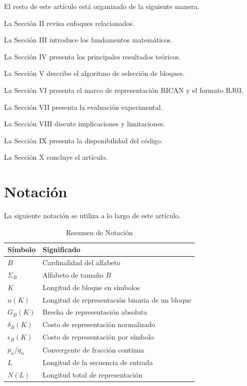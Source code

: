 \documentclass[onecolumn]{IEEEtran}
\begin{document}
El resto de este artículo está organizado de la siguiente manera.

La Sección II revisa enfoques relacionados.

La Sección III introduce los fundamentos matemáticos.

La Sección IV presenta los principales resultados teóricos.

La Sección V describe el algoritmo de selección de bloques.

La Sección VI presenta el marco de representación RICAN y el formato
RJ03.

La Sección VII presenta la evaluación experimental.

La Sección VIII discute implicaciones y limitaciones.

La Sección IX presenta la disponibilidad del código.

La Sección X concluye el artículo.


\section{Notación}

La siguiente notación se utiliza a lo largo de este artículo.

\begin{table}[!t]
\caption{Resumen de Notación}
\label{tab:notation}
\centering
\begin{tabular}{ll}
\toprule
Símbolo & Significado\\
\midrule
$B$ & Cardinalidad del alfabeto\\
$\Sigma_B$ & Alfabeto de tamaño $B$\\
$K$ & Longitud de bloque en símbolos\\
$n(K)$ & Longitud de representación binaria de un bloque\\
$G_B(K)$ & Brecha de representación absoluta\\
$\delta_B(K)$ & Costo de representación normalizado\\
$\epsilon_B(K)$ & Costo de representación por símbolo\\
$p_n/q_n$ & Convergente de fracción continua\\
$L$ & Longitud de la secuencia de entrada\\
$N(L)$ & Longitud total de representación\\
\bottomrule
\end{tabular}
\end{table}
\end{document}
